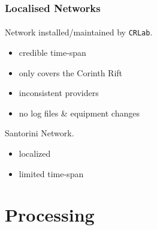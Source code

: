 \documentclass{beamer}
\begin{document}
\begin{frame}\frametitle{Localised Networks}\framesubtitle{}
  Network installed/maintained by \texttt{CRLab}\footnotemark. 
  \begin{itemize}
    \item<pro@1-> credible time-span
    \item<pro@1-> only covers the Corinth Rift
    \item<con@1-> inconsistent providers
    \item<con@1-> no log files \& equipment changes
  \end{itemize}

  Santorini Network. 
  \begin{itemize}
    \item<con@1-> localized
    \item<con@1-> limited time-span
  \end{itemize}

\end{frame}

\section{Processing}
\end{document}
